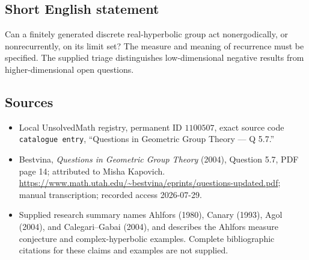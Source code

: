 \documentclass[11pt]{article}
\begin{document}
\subsection{Short English statement}
Can a finitely generated discrete real-hyperbolic group act nonergodically, or nonrecurrently, on its limit set? The measure and meaning of recurrence must be specified. The supplied triage distinguishes low-dimensional negative results from higher-dimensional open questions.
\subsection{Sources}
\begin{itemize}
\item Local UnsolvedMath registry, permanent ID \(1100507\), exact source code \texttt{catalogue entry}, ``Questions in Geometric Group Theory --- Q 5.7.''
\item Bestvina, \emph{Questions in Geometric Group Theory} (2004), Question 5.7, PDF page 14; attributed to Misha Kapovich. \url{https://www.math.utah.edu/~bestvina/eprints/questions-updated.pdf}; manual transcription; recorded access 2026-07-29.
\item Supplied research summary names Ahlfors (1980), Canary (1993), Agol (2004), and Calegari--Gabai (2004), and describes the Ahlfors measure conjecture and complex-hyperbolic examples. Complete bibliographic citations for these claims and examples are not supplied.
\end{itemize}
\end{document}
